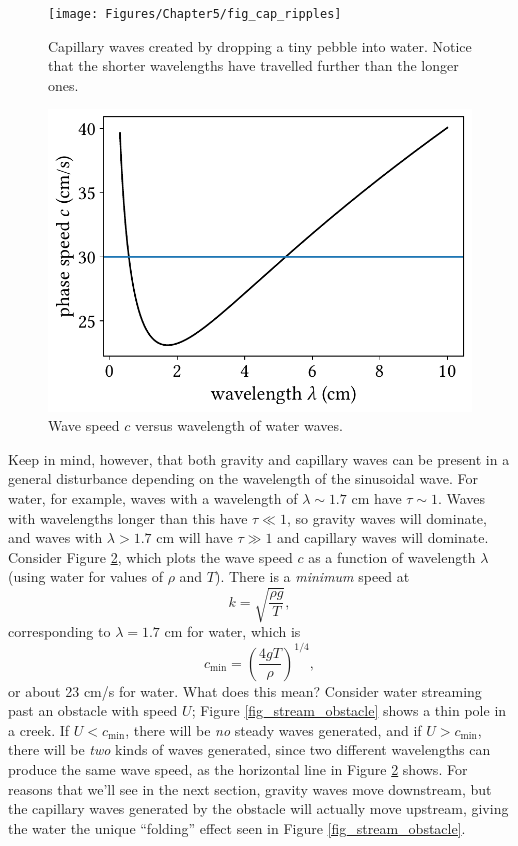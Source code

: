 \begin{figure}
\centering\texttt{[image: Figures/Chapter5/fig\_cap\_ripples]}
\caption{Capillary waves created by dropping a tiny pebble into water.  Notice that the shorter wavelengths have travelled further than the longer ones.}
\label{fig_cap_ripples}
\end{figure}


\begin{figure}
\centering\includegraphics[width=0.7\linewidth]{Figures/Chapter5/fig_grav_and_cap}
\caption{Wave speed $c$ versus wavelength of water waves.}
\label{fig_grav_and_cap}
\end{figure}


Keep in mind, however, that both gravity and capillary waves can be present in a general disturbance depending on the wavelength of the sinusoidal wave.  For water, for example, waves with a wavelength of $\lambda \sim 1.7$ cm have $\tau \sim 1$.  Waves with wavelengths longer than this have $\tau \ll 1$, so gravity waves will dominate, and waves with $\lambda > 1.7$ cm will have $\tau \gg 1$ and capillary waves will dominate.  Consider Figure \ref{fig_grav_and_cap}, which plots the wave speed $c$ as a function of wavelength $\lambda$ (using water for values of $\rho$ and $T$).  There is a \emph{minimum} speed at
\[
k = \sqrt{\frac{\rho g}{T}},
\]
corresponding to $\lambda = 1.7$ cm for water, which is
\begin{equation}
c_\text{min} = \left( \frac{4gT}{\rho} \right)^{1/4},
\end{equation}
or about 23 cm/s for water.  What does this mean?  Consider water streaming past an obstacle with speed $U$; Figure \ref{fig_stream_obstacle} shows a thin pole in a creek.  If $U < c_\text{min}$, there will be \emph{no} steady waves generated, and if $U > c_\text{min}$, there will be \emph{two} kinds of waves generated, since two different wavelengths can produce the same wave speed, as the horizontal line in Figure \ref{fig_grav_and_cap} shows.  For reasons that we'll see in the next section, gravity waves move downstream, but the capillary waves generated by the obstacle will actually move upstream, giving the water the unique ``folding'' effect seen in Figure \ref{fig_stream_obstacle}.

